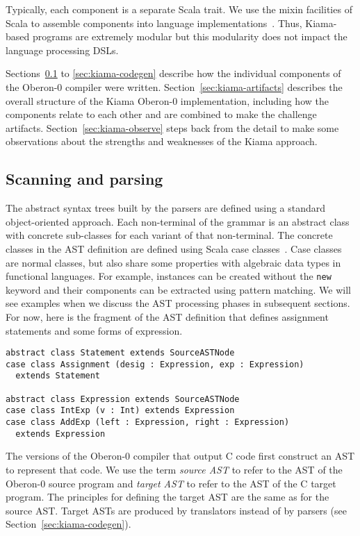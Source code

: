 \noindent
Typically, each component is a separate Scala trait.
We use the mixin facilities of Scala to assemble components into language implementations~\cite[chapter 12]{Odersky10d}.
Thus, Kiama-based programs are extremely modular but this modularity does not impact the language processing DSLs.

Sections~\ref{sec:kiama-scanparse} to \ref{sec:kiama-codegen} describe how the individual components of the Oberon-0 compiler were written.
Section~\ref{sec:kiama-artifacts} describes the overall structure of the Kiama Oberon-0 implementation, including how the components relate to each other and are combined to make the challenge artifacts.
Section~\ref{sec:kiama-observe} steps back from the detail to make some observations about the strengths and weaknesses of the Kiama approach.


\subsection{Scanning and parsing}
\label{sec:kiama-scanparse}

The abstract syntax trees built by the parsers are defined using a standard object-oriented approach.
Each non-terminal of the grammar is an abstract class with concrete sub-classes for each variant of that non-terminal.
The concrete classes in the AST definition are defined using Scala case classes~\cite[chapter 15]{Odersky10d}.
Case classes are normal classes, but also share some properties with algebraic data types in functional languages.
For example, instances can be created without the \verb|new| keyword and their components can be extracted using pattern matching.
We will see examples when we discuss the AST processing phases in subsequent sections.
For now, here is the fragment of the AST definition that defines assignment statements and some forms of expression.

\begin{verbatim}
abstract class Statement extends SourceASTNode
case class Assignment (desig : Expression, exp : Expression)
  extends Statement

abstract class Expression extends SourceASTNode
case class IntExp (v : Int) extends Expression
case class AddExp (left : Expression, right : Expression)
  extends Expression
\end{verbatim}

The versions of the Oberon-0 compiler that output C code first construct an AST to represent that code.
We use the term \emph{source AST} to refer to the AST of the Oberon-0 source program and \emph{target AST} to refer to the AST of the C target program.
The principles for defining the target AST are the same as for the source AST.
Target ASTs are produced by translators instead of by parsers (see Section~\ref{sec:kiama-codegen}).

